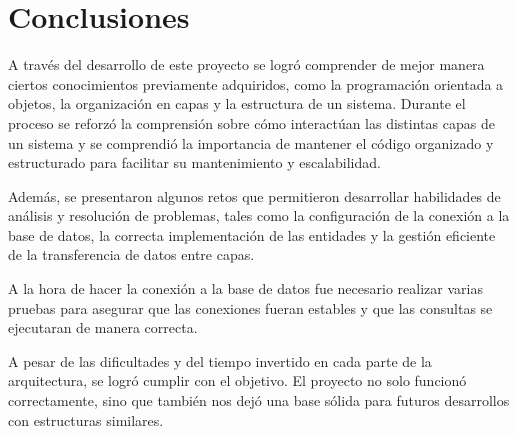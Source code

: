 \section*{Conclusiones}

A través del desarrollo de este proyecto se logró comprender de mejor manera ciertos conocimientos previamente adquiridos, como la programación orientada a objetos, la organización en capas y la estructura de un sistema. Durante el proceso se reforzó la comprensión sobre cómo interactúan las distintas capas de un sistema y se comprendió la importancia de mantener el código organizado y estructurado para facilitar su mantenimiento y escalabilidad.

Además, se presentaron algunos retos que permitieron desarrollar habilidades de análisis y resolución de problemas, tales como la configuración de la conexión a la base de datos, la correcta implementación de las entidades y la gestión eficiente de la transferencia de datos entre capas.

A la hora de hacer la conexión a la base de datos fue necesario realizar varias pruebas para asegurar que las conexiones fueran estables y que las consultas se ejecutaran de manera correcta.

A pesar de las dificultades y del tiempo invertido en cada parte de la arquitectura, se logró cumplir con el objetivo. El proyecto no solo funcionó correctamente, sino que también nos dejó una base sólida para futuros desarrollos con estructuras similares.
